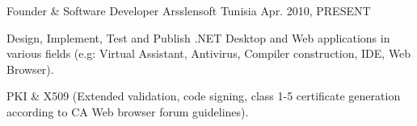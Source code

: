 \begin{cventries}
  \cventry
    {Founder \& Software Developer} %
    {Arsslensoft} %
    {Tunisia} %
    {Apr. 2010, PRESENT} %
    {
      \begin{cvitems} %
        \item {Design, Implement, Test and Publish .NET Desktop and Web applications in various fields (e.g: Virtual Assistant, Antivirus, Compiler construction, IDE, Web Browser).}
        \item {PKI \& X509 (Extended validation, code signing, class 1-5 certificate generation according to CA Web browser forum guidelines).}
      \end{cvitems}
    }

\end{cventries}
